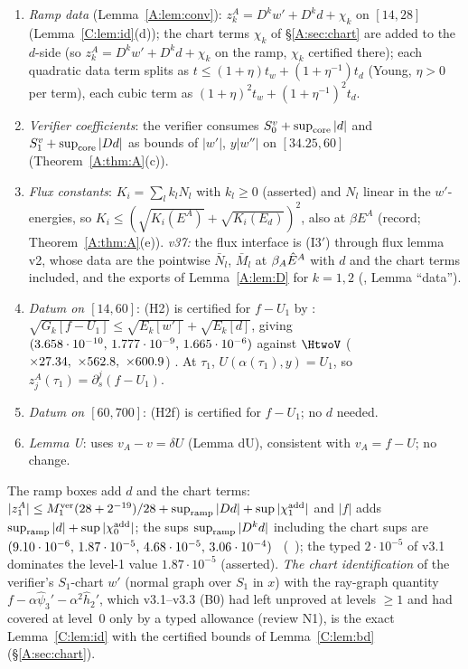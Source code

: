 \documentclass[11pt]{article}
\begin{document}
\begin{remark}\label{A:rem:B0}
\begin{enumerate}[label=(I\arabic*),leftmargin=2.4em]
\item \emph{Ramp data} (Lemma~\ref{A:lem:conv}): $z^A_k=D^k w'+D^kd+\chi_k$ on $[14,28]$ (Lemma~\ref{C:lem:id}(d)); the chart terms $\chi_k$ of \S\ref{A:sec:chart} are added to the $d$-side (so $z^A_k=D^kw'+D^kd+\chi_k$ on the ramp, $\chi_k$ certified there); each quadratic data term splits as $t\le(1+\eta)t_w+(1+\eta^{-1})t_d$ (Young, $\eta>0$ per term), each cubic term as $(1+\eta)^2t_w+(1+\eta^{-1})^2t_d$.
\item \emph{Verifier coefficients}: the verifier consumes $S^v_0+\sup_{\rm core}|d|$ and $S^v_1+\sup_{\rm core}|Dd|$ as bounds of $|w'|$, $y|w''|$ on $[34.25,60]$ (Theorem~\ref{A:thm:A}(c)).
\item \emph{Flux constants}: $K_i=\sum_lk_lN_l$ with $k_l\ge0$ (asserted) and $N_l$ linear in the $w'$-energies, so $K_i\le(\sqrt{K_i(E^A)}+\sqrt{K_i(E_d)})^2$, also at $\beta E^A$ (record; Theorem~\ref{A:thm:A}(e)). \emph{v37:} the flux interface is (I3$'$) through flux lemma v2, whose data are the pointwise $\bar N_l$, $\bar M_l$ at $\beta_A\hat E^A$ with $d$ and the chart terms included, and the exports of Lemma~\ref{A:lem:D} for $k=1,2$ (, Lemma ``data'').
\item \emph{Datum on $[14,60]$}: (H2) is certified for $f-U_1$ by : $\sqrt{G_k[f-U_1]}\le\sqrt{E_k[w']}+\sqrt{E_k[d]}$, giving $(3.658\cdot10^{-10},\,1.777\cdot10^{-9},\,1.665\cdot10^{-6})$ against $\HtwoV$ ($\times27.34,\ \times562.8,\ \times600.9$) \tC. At $\tau_1$, $U(\alpha(\tau_1),y)=U_1$, so $z^A_j(\tau_1)=\partial_s^j(f-U_1)$.
\item \emph{Datum on $[60,700]$}: (H2f) is certified for $f-U_1$; no $d$ needed.
\item \emph{Lemma U}: uses $v_A-v=\delta U$ (Lemma dU), consistent with $v_A=f-U$; no change.
\end{enumerate}
The ramp boxes add $d$ and the chart terms: $|z^A_1|\le M_1^{\rm ver}(28+2^{-19})/28+\sup_{\rm ramp}|Dd|+\sup|\chi^{\rm add}_1|$ and $|f|$ adds $\sup_{\rm ramp}|d|+\sup|\chi^{\rm add}_0|$; the sups $\sup_{\rm ramp}|D^kd|$ including the chart sups are $(9.10\cdot10^{-6},\,1.87\cdot10^{-5},\,4.68\cdot10^{-5},\,3.06\cdot10^{-4})$ \tC\ (\SA\ ); the typed $2\cdot10^{-5}$ of v3.1 dominates the level-1 value $1.87\cdot10^{-5}$ (asserted). \emph{The chart identification} of the verifier's $S_1$-chart $w'$ (normal graph over $S_1$ in $x$) with the ray-graph quantity $f-\alpha\hat\psi_3'-\alpha^2\hat h_2'$, which v3.1--v3.3 (B0) had left unproved at levels $\ge1$ and had covered at level~0 only by a typed allowance (review N1), is the exact Lemma~\ref{C:lem:id} with the certified bounds of Lemma~\ref{C:lem:bd} (\S\ref{A:sec:chart}).
\end{remark}
\end{document}
